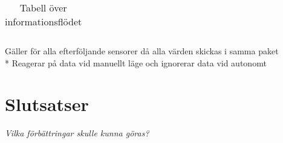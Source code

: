 \documentclass[11pt]{article}
\begin{document}
\begin{flushleft}
\begin{table}[h]
\begin{tabular}{|p{6em}|p{1em}|p{6em}|p{25em}|}
\end{tabular}

\text{*} Gäller för alla efterföljande sensorer då alla värden skickas i samma paket \\*
\text{**} Reagerar på data vid manuellt läge och ignorerar data vid autonomt

\caption{Tabell över informationsflödet} \label{tab}
\end{table}



\pagebreak
\section{Slutsatser}
\textit{Vilka förbättringar skulle kunna göras?}

\pagebreak
{}



\pagebreak


\appendix

\end{flushleft}
\end{document}
